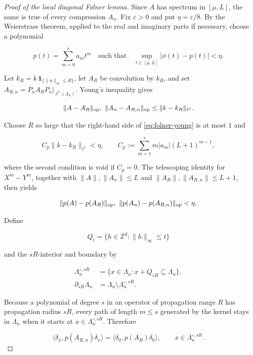 \begin{proof}[Proof of the local diagonal Følner lemma]
Since \(A\) has spectrum in \([\mu,L]\), the same is true of every compression
\(A_n\). Fix \(\varepsilon>0\) and put \(\eta=\varepsilon/8\). By the
Weierstrass theorem, applied to the real and imaginary parts if necessary,
choose a polynomial

\[
p(t)=\sum_{m=0}^{s}a_mt^m
\quad\text{such that}\quad
\sup_{t\in[\mu,L]}|\phi(t)-p(t)|<\eta.
\]

Let \(k_R=k\,\mathbf 1_{\{\|u\|_\infty\le R\}}\), let \(A_R\) be convolution
by \(k_R\), and set \(A_{R,n}=P_nA_RP_n|_{\ell^2(\Lambda_n)}\). Young's
inequality gives

\begin{equation}\label{eq:folner-young}
\|A-A_R\|_{\rm op},\ \|A_n-A_{R,n}\|_{\rm op}
\le\|k-k_R\|_{\ell^1}.
\end{equation}

Choose \(R\) so large that the right-hand side of
\eqref{eq:folner-young} is at most \(1\) and

\[
C_p\|k-k_R\|_{\ell^1}<\eta,\qquad
C_p:=\sum_{m=1}^{s}m|a_m|(L+1)^{m-1},
\]

where the second condition is void if \(C_p=0\). The telescoping identity for
\(X^m-Y^m\), together with
\(\|A\|,\|A_n\|\le L\) and
\(\|A_R\|,\|A_{R,n}\|\le L+1\), then yields

\begin{equation}\label{eq:folner-polynomial-truncation}
\|p(A)-p(A_R)\|_{\rm op},
\ \|p(A_n)-p(A_{R,n})\|_{\rm op}<\eta.
\end{equation}

Define

\[
Q_t=\{h\in\mathbb Z^d:\|h\|_\infty\le t\}
\]

and the \(sR\)-interior and boundary by

\begin{align*}
\Lambda_n^{\circ,sR}
&=\{x\in\Lambda_n:x+Q_{sR}\subseteq\Lambda_n\},\\
\partial_{sR}\Lambda_n
&=\Lambda_n\setminus\Lambda_n^{\circ,sR}.
\end{align*}

Because a polynomial of degree \(s\) in an operator of propagation range
\(R\) has propagation radius \(sR\), every path of length \(m\le s\) generated
by the kernel stays in \(\Lambda_n\) when it starts at
\(x\in\Lambda_n^{\circ,sR}\). Therefore

\begin{equation}\label{eq:folner-interior-equality}
\langle\delta_x,p(A_{R,n})\delta_x\rangle
=\langle\delta_0,p(A_R)\delta_0\rangle,
\qquad x\in\Lambda_n^{\circ,sR}.
\end{equation}


\end{proof}
